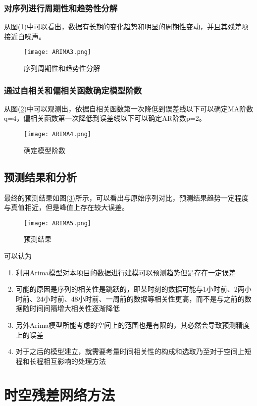 \subsubsection*{对序列进行周期性和趋势性分解}
从图(\ref{fig:ARIMA3})中可以看出，数据有长期的变化趋势和明显的周期性变动，并且其残差项接近白噪声。

\begin{figure}[ht]
\centering
\texttt{[image: ARIMA3.png]}
\caption{序列周期性和趋势性分解}
\label{fig:ARIMA3}
\end{figure}

\subsubsection*{通过自相关和偏相关函数确定模型阶数}
从图(\ref{fig:ARIMA4})中可以观测出，依据自相关函数第一次降低到误差线以下可以确定MA阶数q=4，偏相关函数第一次降低到误差线以下可以确定AR阶数p=2。

\begin{figure}[ht]
\centering
\texttt{[image: ARIMA4.png]}
\caption{确定模型阶数}
\label{fig:ARIMA4}
\end{figure}
\subsection{预测结果和分析}
最终的预测结果如图(\ref{fig:ARIMA5})所示，可以看出与原始序列对比，预测结果趋势一定程度与真值相近，但是峰值上存在较大误差。
\begin{figure}[ht]
\centering
\texttt{[image: ARIMA5.png]}
\caption{预测结果}
\label{fig:ARIMA5}
\end{figure}
可以认为
\begin{enumerate}
	\item 利用Arima模型对本项目的数据进行建模可以预测趋势但是存在一定误差
	\item 可能的原因是序列的相关性是跳跃的，即某时刻的数据可能与1小时前、2两小时前、24小时前、48小时前、一周前的数据等相关性更高，而不是与之前的数据随时间间隔增大相关性逐渐降低
	\item 另外Arima模型所能考虑的空间上的范围也是有限的，其必然会导致预测精度上的误差
	\item 对于之后的模型建立，就需要考量时间相关性的构成和选取乃至对于空间上短程和长程相互影响的处理方法
\end{enumerate}


\section{时空残差网络方法}
